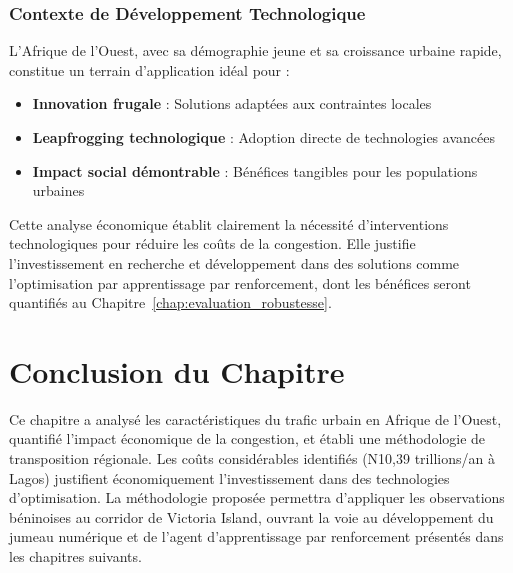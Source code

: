 \subsubsection{Contexte de Développement Technologique}
L'Afrique de l'Ouest, avec sa démographie jeune et sa croissance urbaine rapide, constitue un terrain d'application idéal pour :
\begin{itemize}
    \item \textbf{Innovation frugale} : Solutions adaptées aux contraintes locales
    \item \textbf{Leapfrogging technologique} : Adoption directe de technologies avancées
    \item \textbf{Impact social démontrable} : Bénéfices tangibles pour les populations urbaines
\end{itemize}

Cette analyse économique établit clairement la nécessité d'interventions technologiques pour réduire les coûts de la congestion. Elle justifie l'investissement en recherche et développement dans des solutions comme l'optimisation par apprentissage par renforcement, dont les bénéfices seront quantifiés au Chapitre~\ref{chap:evaluation_robustesse}.

\section{Conclusion du Chapitre}
Ce chapitre a analysé les caractéristiques du trafic urbain en Afrique de l'Ouest, quantifié l'impact économique de la congestion, et établi une méthodologie de transposition régionale. Les coûts considérables identifiés (N10,39 trillions/an à Lagos) justifient économiquement l'investissement dans des technologies d'optimisation. La méthodologie proposée permettra d'appliquer les observations béninoises au corridor de Victoria Island, ouvrant la voie au développement du jumeau numérique et de l'agent d'apprentissage par renforcement présentés dans les chapitres suivants.




